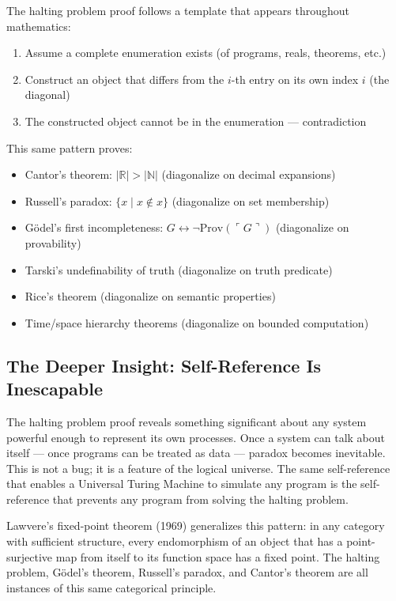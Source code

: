 The halting problem proof follows a template that appears throughout mathematics:

\begin{enumerate}
\item Assume a complete enumeration exists (of programs, reals, theorems, etc.)
\item Construct an object that differs from the $i$-th entry on its own index $i$ (the diagonal)
\item The constructed object cannot be in the enumeration — contradiction
\end{enumerate}

This same pattern proves:
\begin{itemize}
\item Cantor's theorem: $|\mathbb{R}| > |\mathbb{N}|$ (diagonalize on decimal expansions)
\item Russell's paradox: $\{x \mid x \notin x\}$ (diagonalize on set membership)
\item G\"odel's first incompleteness: $G \leftrightarrow \neg\text{Prov}(\ulcorner G \urcorner)$ (diagonalize on provability)
\item Tarski's undefinability of truth (diagonalize on truth predicate)
\item Rice's theorem (diagonalize on semantic properties)
\item Time/space hierarchy theorems (diagonalize on bounded computation)
\end{itemize}

\subsection*{The Deeper Insight: Self-Reference Is Inescapable}

The halting problem proof reveals something significant about any system powerful enough to represent its own processes. Once a system can talk about itself — once programs can be treated as data — paradox becomes inevitable. This is not a bug; it is a feature of the logical universe. The same self-reference that enables a Universal Turing Machine to simulate any program is the self-reference that prevents any program from solving the halting problem.

Lawvere's fixed-point theorem (1969) generalizes this pattern: in any category with sufficient structure, every endomorphism of an object that has a point-surjective map from itself to its function space has a fixed point. The halting problem, G\"odel's theorem, Russell's paradox, and Cantor's theorem are all instances of this same categorical principle.

